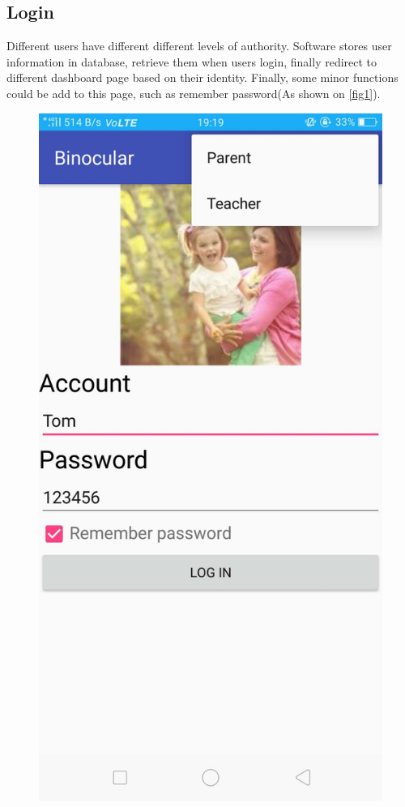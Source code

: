 \documentclass{article}
\begin{document}
\subsection{Login}
Different users have different different levels of authority. Software stores user information in database, retrieve them when users login, finally redirect to different dashboard page based on their identity. Finally, some minor functions could be add to this page, such as remember password(As shown on \ref{fig1}).

 	\begin{figure}[H] 
 		\begin{minipage}[b]{0.28\linewidth}
		 	\centering
	 		\includegraphics[width=\linewidth]{img/login2.png}

\end{minipage}
\end{figure}
\end{document}
